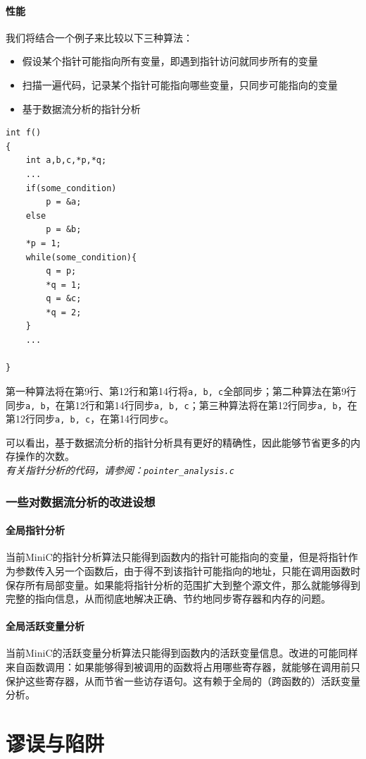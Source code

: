 \paragraph*{性能}
我们将结合一个例子来比较以下三种算法：
\begin{itemize}
	\item 假设某个指针可能指向所有变量，即遇到指针访问就同步所有的变量
	\item 扫描一遍代码，记录某个指针可能指向哪些变量，只同步可能指向的变量
	\item 基于数据流分析的指针分析
\end{itemize}
\begin{lstlisting}
int f()
{
	int a,b,c,*p,*q;
	...
	if(some_condition)
		p = &a;
	else
		p = &b;
	*p = 1;
	while(some_condition){
		q = p;
		*q = 1;
		q = &c;
		*q = 2;
	}
	...

}
\end{lstlisting}
第一种算法将在第9行、第12行和第14行将\verb|a, b, c|全部同步；第二种算法在第9行同步\verb|a, b|，在第12行和第14行同步\verb|a, b, c|；第三种算法将在第12行同步\verb|a, b|，在第12行同步\verb|a, b, c|，在第14行同步\verb|c|。

可以看出，基于数据流分析的指针分析具有更好的精确性，因此能够节省更多的内存操作的次数。\\
{\it \anchor 有关指针分析的代码，请参阅：\verb|pointer_analysis.c|}\\

\subsubsection{一些对数据流分析的改进设想}
\paragraph*{全局指针分析}
当前MiniC的指针分析算法只能得到函数内的指针可能指向的变量，但是将指针作为参数传入另一个函数后，由于得不到该指针可能指向的地址，只能在调用函数时保存所有局部变量。如果能将指针分析的范围扩大到整个源文件，那么就能够得到完整的指向信息，从而彻底地解决正确、节约地同步寄存器和内存的问题。
\paragraph*{全局活跃变量分析}
当前MiniC的活跃变量分析算法只能得到函数内的活跃变量信息。改进的可能同样来自函数调用：如果能够得到被调用的函数将占用哪些寄存器，就能够在调用前只保护这些寄存器，从而节省一些访存语句。这有赖于全局的（跨函数的）活跃变量分析。
\section{谬误与陷阱}
\label{pitfallc2}
